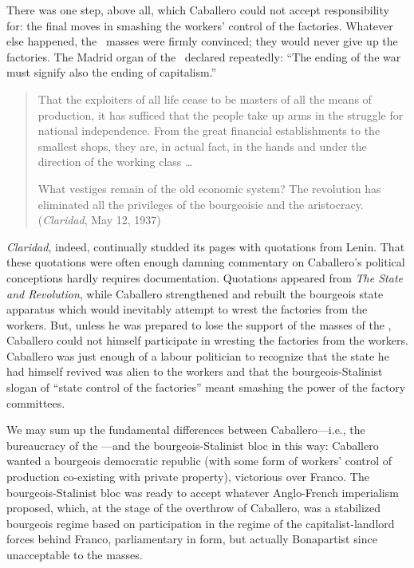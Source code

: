There was one step, above all, which Caballero could not accept responsibility for: the final moves in smashing the workers’ control of the factories. Whatever else happened, the \UGT\ masses were firmly convinced; they would never give up the factories. The Madrid organ of the \UGT\ declared repeatedly: ``The ending of the war must signify also the ending of capitalism.''
\nowidow

\begin{quotation}
  That the exploiters of all life cease to be masters of all the means of production, it has sufficed that the people take up arms in the struggle for national independence. From the great financial establishments to the smallest shops, they are, in actual fact, in the hands and under the direction of the working class \dots
  
  What vestiges remain of the old economic system? The revolution has eliminated all the privileges of the bourgeoisie and the aristocracy. (\emph{Claridad}, May 12, 1937)
\end{quotation}

\emph{Claridad}, indeed, continually studded its pages with quotations from Lenin. That these quotations were often enough damning commentary on Caballero’s political conceptions hardly requires documentation. Quotations appeared from \emph{The State and Revolution}, while Caballero strengthened and rebuilt the bourgeois state apparatus which would inevitably attempt to wrest the factories from the workers. But, unless he was prepared to lose the support of the masses of the \UGT, Caballero could not himself participate in wresting the factories from the workers. Caballero was just enough of a labour politician to recognize that the state he had himself revived was alien to the workers and that the bourgeois-Stalinist slogan of ``state control of the factories'' meant smashing the power of the factory committees.

We may sum up the fundamental differences between Caballero---i.e., the bureaucracy of the \UGT---and the bourgeois-Stalinist bloc in this way: Caballero wanted a bourgeois democratic republic (with some form of workers’ control of production co-existing with private property), victorious over Franco. The bourgeois-Stalinist bloc was ready to accept whatever Anglo-French imperialism proposed, which, at the stage of the overthrow of Caballero, was a stabilized bourgeois regime based on participation in the regime of the capitalist-landlord forces behind Franco, parliamentary in form, but actually Bonapartist since unacceptable to the masses.
\nowidow

